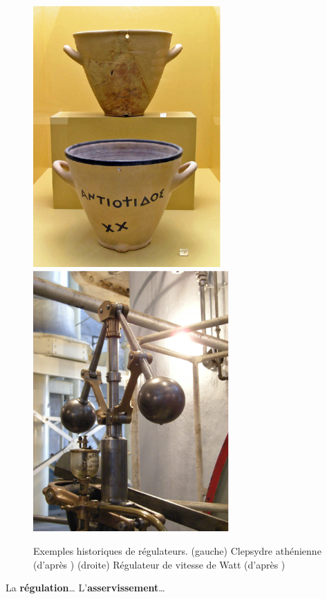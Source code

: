 \begin{figure}[!h]
    \centering
        \includegraphics[width=0.45\linewidth,height=10cm]{fig/AGMA_Clepsydre_m.eps}
        \label{fig-clep}
        \includegraphics[width=0.45\linewidth,height=10cm]{fig/Georgetown_PowerPlant_Museum_m.eps}
        \label{fig-watt}
    \caption{Exemples historiques de régulateurs. (gauche) Clepsydre athénienne (d'après \cite{clep}) 
                                                  (droite) Régulateur de vitesse de Watt (d'après \cite{watt})\label{fig-hist}}
\end{figure}

La \textbf{régulation}\ldots
L'\textbf{asservissement}\ldots


